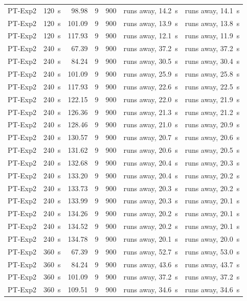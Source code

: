 {\begin{longtable}{llrrrll}
PT-Exp2 & 120~s & 98.98 & 9 & 900 & runs away, 14.2~s & runs away, 14.1~s \\
PT-Exp2 & 120~s & 101.09 & 9 & 900 & runs away, 13.9~s & runs away, 13.8~s \\
PT-Exp2 & 120~s & 117.93 & 9 & 900 & runs away, 12.1~s & runs away, 11.9~s \\
PT-Exp2 & 240~s & 67.39 & 9 & 900 & runs away, 37.2~s & runs away, 37.2~s \\
PT-Exp2 & 240~s & 84.24 & 9 & 900 & runs away, 30.5~s & runs away, 30.4~s \\
PT-Exp2 & 240~s & 101.09 & 9 & 900 & runs away, 25.9~s & runs away, 25.8~s \\
PT-Exp2 & 240~s & 117.93 & 9 & 900 & runs away, 22.6~s & runs away, 22.5~s \\
PT-Exp2 & 240~s & 122.15 & 9 & 900 & runs away, 22.0~s & runs away, 21.9~s \\
PT-Exp2 & 240~s & 126.36 & 9 & 900 & runs away, 21.3~s & runs away, 21.2~s \\
PT-Exp2 & 240~s & 128.46 & 9 & 900 & runs away, 21.0~s & runs away, 20.9~s \\
PT-Exp2 & 240~s & 130.57 & 9 & 900 & runs away, 20.7~s & runs away, 20.6~s \\
PT-Exp2 & 240~s & 131.62 & 9 & 900 & runs away, 20.6~s & runs away, 20.5~s \\
PT-Exp2 & 240~s & 132.68 & 9 & 900 & runs away, 20.4~s & runs away, 20.3~s \\
PT-Exp2 & 240~s & 133.20 & 9 & 900 & runs away, 20.4~s & runs away, 20.2~s \\
PT-Exp2 & 240~s & 133.73 & 9 & 900 & runs away, 20.3~s & runs away, 20.2~s \\
PT-Exp2 & 240~s & 133.99 & 9 & 900 & runs away, 20.3~s & runs away, 20.1~s \\
PT-Exp2 & 240~s & 134.26 & 9 & 900 & runs away, 20.2~s & runs away, 20.1~s \\
PT-Exp2 & 240~s & 134.52 & 9 & 900 & runs away, 20.2~s & runs away, 20.1~s \\
PT-Exp2 & 240~s & 134.78 & 9 & 900 & runs away, 20.1~s & runs away, 20.0~s \\
PT-Exp2 & 360~s & 67.39 & 9 & 900 & runs away, 52.7~s & runs away, 53.0~s \\
PT-Exp2 & 360~s & 84.24 & 9 & 900 & runs away, 43.6~s & runs away, 43.7~s \\
PT-Exp2 & 360~s & 101.09 & 9 & 900 & runs away, 37.2~s & runs away, 37.2~s \\
PT-Exp2 & 360~s & 109.51 & 9 & 900 & runs away, 34.6~s & runs away, 34.6~s \\

\end{longtable}}
